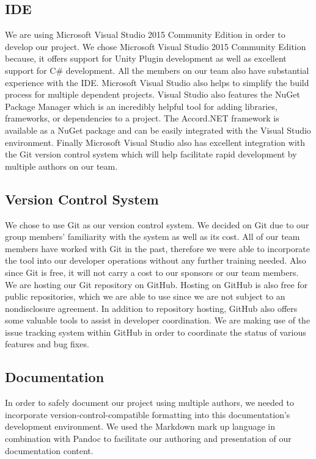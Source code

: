 \documentclass[12pt]{article}
\begin{document}
\subsection{IDE}\label{ide}

We are using Microsoft Visual Studio 2015 Community Edition in order to
develop our project. We chose Microsoft Visual Studio 2015 Community
Edition because, it offers support for Unity Plugin development as well
as excellent support for C\# development. All the members on our team
also have substantial experience with the IDE. Microsoft Visual Studio
also helps to simplify the build process for multiple dependent
projects. Visual Studio also features the NuGet Package Manager which is
an incredibly helpful tool for adding libraries, frameworks, or
dependencies to a project. The Accord.NET framework is available as a
NuGet package and can be easily integrated with the Visual Studio
environment. Finally Microsoft Visual Studio also has excellent
integration with the Git version control system which will help
facilitate rapid development by multiple authors on our team.

\subsection{Version Control System}\label{version-control-system}

We chose to use Git as our version control system. We decided on Git due
to our group members' familiarity with the system as well as its cost.
All of our team members have worked with Git in the past, therefore we
were able to incorporate the tool into our developer operations without
any further training needed. Also since Git is free, it will not carry a
cost to our sponsors or our team members. We are hosting our Git
repository on GitHub. Hosting on GitHub is also free for public
repositories, which we are able to use since we are not subject to an
nondisclosure agreement. In addition to repository hosting, GitHub also
offers some valuable tools to assist in developer coordination. We are
making use of the issue tracking system within GitHub in order to
coordinate the status of various features and bug fixes.

\subsection{Documentation}\label{documentation}

In order to safely document our project using multiple authors, we
needed to incorporate version-control-compatible formatting into this
documentation's development environment. We used the Markdown mark up
language in combination with Pandoc to facilitate our authoring and
presentation of our documentation content.
\end{document}

